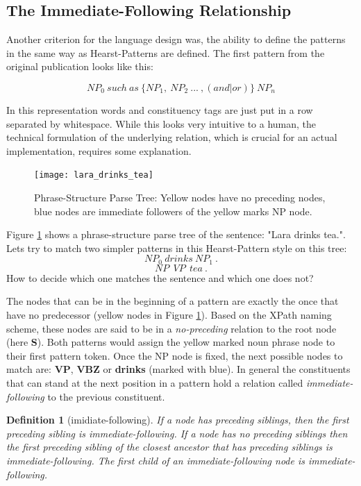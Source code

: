 \documentclass[english]{article}
\newtheorem*{definition}{Definition}
\begin{document}
\subsection{The Immediate-Following Relationship}

Another criterion for the language design was, the ability to define the patterns in the same way as Hearst-Patterns \cite{hearst_automatic_1992} are defined. The first pattern from the original publication looks like this:

\[ NP_0\ such\ as\ \{NP_1,\ NP_2\ ...\ ,(and|or)\}\ NP_n \]

In this representation words and constituency tags are just put in a row separated by whitespace. While this looks very intuitive to a human, the technical formulation of the underlying relation, which is crucial for an actual implementation, requires some explanation.

\label{ssec:imidiate-following}

\begin{figure}
\centering
\texttt{[image: lara\_drinks\_tea]}
\caption{Phrase-Structure Parse Tree: Yellow nodes have no preceding nodes, blue nodes are immediate followers of the yellow marks NP node.}
\label{fig:lara-drinks-tea}
\end{figure}


Figure \ref{fig:lara-drinks-tea} shows a phrase-structure parse tree of the sentence: "Lara drinks tea.". Lets try to match two simpler patterns in this Hearst-Pattern style on this tree:
\[NP_0\ drinks\ NP_1\ .\]
\[NP\ \ VP\ \ tea\ .\]
How to decide which one matches the sentence and which one does not?  

The nodes that can be in the beginning of a pattern are exactly the once that have no predecessor (yellow nodes in Figure \ref{fig:lara-drinks-tea}). Based on the XPath naming scheme, these nodes are said to be in a \textit{no-preceding} relation to the root node (here \textbf{S}). Both patterns would assign the yellow marked noun phrase node to their first pattern token. Once the NP node is fixed, the next possible nodes to match are: \textbf{VP}, \textbf{VBZ} or \textbf{drinks} (marked with blue). In general the constituents that can stand at the next position in a pattern hold a relation called \textit{immediate-following} to the previous constituent.

\begin{definition}[imidiate-following]
 If a node has preceding siblings, then the first preceding sibling is immediate-following. If a node has no preceding siblings then the first preceding sibling of the closest ancestor that has preceding siblings is immediate-following. The first child of an immediate-following node is immediate-following.
\end{definition}
\end{document}
